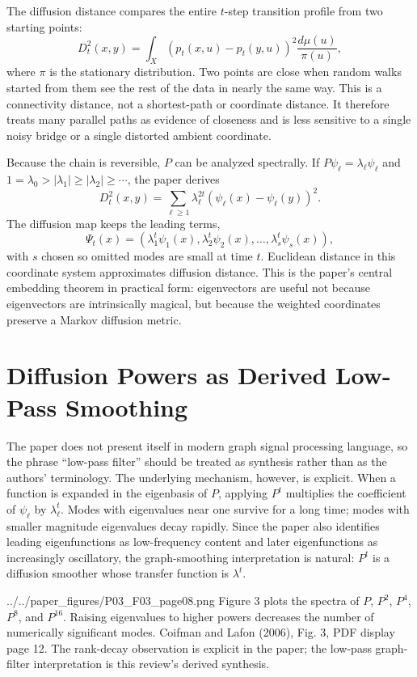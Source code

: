 \documentclass[11pt]{article}
\begin{document}
The diffusion distance compares the entire $t$-step transition profile from
two starting points:
\[
  D_t^2(x,y)
  =
  \int_X
  \left(p_t(x,u)-p_t(y,u)\right)^2
  \frac{d\mu(u)}{\pi(u)},
\]
where $\pi$ is the stationary distribution.  Two points are close when random
walks started from them see the rest of the data in nearly the same way.  This
is a connectivity distance, not a shortest-path or coordinate distance.  It
therefore treats many parallel paths as evidence of closeness and is less
sensitive to a single noisy bridge or a single distorted ambient coordinate.

Because the chain is reversible, $P$ can be analyzed spectrally.  If
$P\psi_\ell=\lambda_\ell\psi_\ell$ and
$1=\lambda_0>|\lambda_1|\ge |\lambda_2|\ge \cdots$, the paper derives
\[
  D_t^2(x,y)
  =
  \sum_{\ell\ge 1}
  \lambda_\ell^{2t}
  \left(\psi_\ell(x)-\psi_\ell(y)\right)^2.
\]
The diffusion map keeps the leading terms,
\[
  \Psi_t(x)
  =
  \left(
    \lambda_1^t\psi_1(x),
    \lambda_2^t\psi_2(x),
    \ldots,
    \lambda_s^t\psi_s(x)
  \right),
\]
with $s$ chosen so omitted modes are small at time $t$.  Euclidean distance in
this coordinate system approximates diffusion distance.  This is the paper's
central embedding theorem in practical form: eigenvectors are useful not
because eigenvectors are intrinsically magical, but because the weighted
coordinates preserve a Markov diffusion metric.

\section{Diffusion Powers as Derived Low-Pass Smoothing}

The paper does not present itself in modern graph signal processing language,
so the phrase ``low-pass filter'' should be treated as synthesis rather than
as the authors' terminology.  The underlying mechanism, however, is explicit.
When a function is expanded in the eigenbasis of $P$, applying $P^t$ multiplies
the coefficient of $\psi_\ell$ by $\lambda_\ell^t$.  Modes with eigenvalues
near one survive for a long time; modes with smaller magnitude eigenvalues
decay rapidly.  Since the paper also identifies leading eigenfunctions as
low-frequency content and later eigenfunctions as increasingly oscillatory,
the graph-smoothing interpretation is natural: $P^t$ is a diffusion smoother
whose transfer function is $\lambda^t$.

\paperfigure
  {../../paper_figures/P03_F03_page08.png}
  {Figure 3 plots the spectra of $P$, $P^2$, $P^4$, $P^8$, and $P^{16}$.
  Raising eigenvalues to higher powers decreases the number of numerically
  significant modes.}
  {Coifman and Lafon (2006), Fig. 3, PDF display page 12.}
  {The rank-decay observation is explicit in the paper; the low-pass
  graph-filter interpretation is this review's derived synthesis.}
\end{document}
